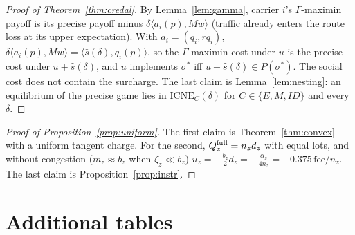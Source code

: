 \documentclass[preprint,12pt]{elsarticle}
\theoremstyle{definition}
\theoremstyle{remark}
\newcommand{\ICNE}{\mathrm{ICNE}}
\newcommand{\ip}[2]{\langle #1,#2\rangle}
\begin{document}
\begin{proof}[Proof of Theorem~\ref{thm:credal}]
By Lemma~\ref{lem:gamma}, carrier $i$'s $\Gamma$-maximin payoff is its precise payoff minus $\delta\ip{a_i(p)}{Mw}$ (traffic already enters the route loss at its upper expectation). With $a_i=(q_i,rq_i)$, $\delta\ip{a_i(p)}{Mw}=\ip{\hat s(\delta)}{q_i(p)}$, so the $\Gamma$-maximin cost under $u$ is the precise cost under $u+\hat s(\delta)$, and $u$ implements $\sigma^*$ iff $u+\hat s(\delta)\in P(\sigma^*)$. The social cost does not contain the surcharge. The last claim is Lemma~\ref{lem:nesting}: an equilibrium of the precise game lies in $\ICNE_C(\delta)$ for $C\in\{E,M,ID\}$ and every $\delta$.
\end{proof}

\begin{proof}[Proof of Proposition~\ref{prop:uniform}]
The first claim is Theorem~\ref{thm:convex} with a uniform tangent charge. For the second, $Q^{\rm full}_z=n_zd_z$ with equal lots, and without congestion ($m_z\approx b_z$ when $\zeta_z\ll b_z$) $u_z=-\tfrac{b_z}{2}d_z=-\tfrac{\alpha_z}{4n_z}=-0.375\,\mathrm{fee}/n_z$. The last claim is Proposition~\ref{prop:instr}.
\end{proof}

\section{Additional tables}\label{app:tables}

\begin{table}[h]\centering\small
\caption{Coverage of the exact-oracle game experiments per city and seed: exact grid points of the leader experiment (out of 63), price-of-anarchy experiment computed (yes/--), and exact widths of the imprecision experiment (out of 12); -- means not computed with the exact oracle. The base equilibria are exact for all city-seeds.}\label{tab:coverage}
\end{table}

\begin{table}[h]\centering\small
\caption{Calibration per city (base values; ranges and sources in \texttt{data/parameters/SOURCES.md}). Parcels per capita are country-level; TomTom congestion is the 2025 city value (Moscow: 2020); drops per vehicle and van capacity are proxies outside the United States; fees and wages are graded C for most cities.}\label{tab:params}
\end{table}
\end{document}
